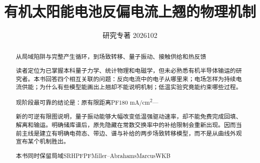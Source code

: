 \begin{titlepage}
\title{\textbf{{\cjkfont 有机太阳能电池反偏电流上翘的物理机制}\allowbreak{}}}
\author{}
\date{{\cjkfont 研究专著}\allowbreak{} 2026\allowbreak{}10\allowbreak{}2\allowbreak{}}
\maketitle
\thispagestyle{empty}
\begin{abstract}
{\cjkfont 从局域陷阱与完整产生循环，到场致转移、量子振动、接触供给和热反馈}\allowbreak{}
\par
{\cjkfont 读者定位为已掌握本科量子力学、统计物理和电磁学，但未必熟悉有机半导体输运的研究者。本书回答四个相互关联的问题：反向电流中的电子从哪里来；电场怎样为持续电流供能；为什么有些模型能画出上翘却不能说明机制；低温实验究竟能约束哪些过程。}\allowbreak{}
\par
{\cjkfont 现阶段最可靠的结论是：原有限距离}\allowbreak{}PF\allowbreak{}180 mA/cm\textsuperscript{2}\allowbreak{}—\allowbreak{}
\par
{\cjkfont 新的可逆有限图说明，量子振动能够大幅改变低温强驱动速率，却不能免费完成回填、解离和输运。明确储库谱后，原先隐藏在常数交换率中的补给限制会重新出现。因而当前主线是建立有明确电荷态、带边、谱与补给的两步场致转移模型，而不是从曲线外观宣布某个机制胜出。}\allowbreak{}
\par
{\cjkfont 本书同时保留局域}\allowbreak{}SRH\allowbreak{}PF\allowbreak{}PF\allowbreak{}Miller–Abrahams\allowbreak{}Marcus\allowbreak{}WKB\allowbreak{}
\par
{}
\medskip
\end{abstract}
\end{titlepage}
